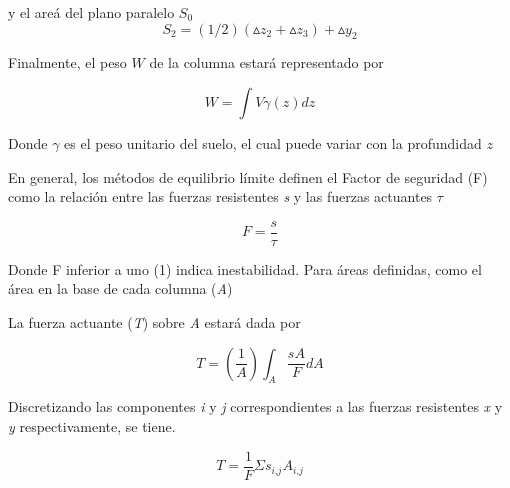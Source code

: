 y el are\'a del plano paralelo $\textit{S}_{0}$
$$ \textit{S}_{2} = (1/2)(\vartriangle z_{2} +\vartriangle z_{3})+\vartriangle \textit{y}_{2}  $$

Finalmente, el peso $W$ de la columna estar\'a representado por

$$\textit{W} = \int \textit{V} \gamma (\textit{z}) \textit{dz} $$

Donde $ \gamma$ es el peso unitario del suelo, el cual puede variar con la profundidad $\textit{z}$

En general, los m\'etodos de equilibrio l\'imite definen el Factor de seguridad (F) como la relaci\'on entre las fuerzas resistentes  \textit{s} y las fuerzas actuantes $\tau$

$$F =\frac{\textit{s}}{\tau}$$

Donde F inferior a uno (1) indica inestabilidad. Para \'areas definidas, como el \'area en la base de cada columna (\textit{A})

La fuerza actuante (\textit{T}) sobre \textit{A} estar\'a dada por

$$\textit{T}=\left(\frac{1}{\textit{A}}\right)\int_{\textit{A}}^{} \frac{\textit{s}\textit{A}}{\textit{F}} \textit{dA}$$

Discretizando las componentes \textit{i} y \textit{j} correspondientes a las fuerzas resistentes \textit{x} y \textit{y} respectivamente, se tiene.

$$\textit{T} = \frac{1}{\textit{F}} \Sigma\textit{s}_{\textit{i,j}} \textit{A}_{\textit{i,j}}$$

